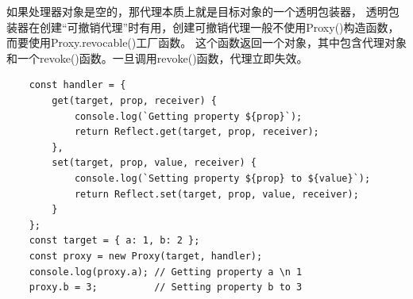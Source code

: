 如果处理器对象是空的，那代理本质上就是目标对象的一个透明包装器，
透明包装器在创建“可撤销代理”时有用，创建可撤销代理一般不使用Proxy()构造函数，而要使用Proxy.revocable()工厂函数。
这个函数返回一个对象，其中包含代理对象和一个revoke()函数。一旦调用revoke()函数，代理立即失效。
\begin{verbatim}
    const handler = {
        get(target, prop, receiver) {
            console.log(`Getting property ${prop}`);
            return Reflect.get(target, prop, receiver);
        },
        set(target, prop, value, receiver) {
            console.log(`Setting property ${prop} to ${value}`);
            return Reflect.set(target, prop, value, receiver);
        }
    }; 
    const target = { a: 1, b: 2 };
    const proxy = new Proxy(target, handler);
    console.log(proxy.a); // Getting property a \n 1
    proxy.b = 3;          // Setting property b to 3
\end{verbatim}



